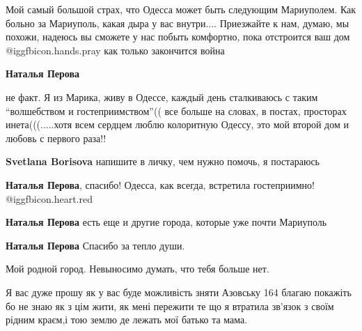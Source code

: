 \begin{itemize}

Мой самый большой страх, что Одесса может быть следующим Мариуполем. Как больно
за Мариуполь, какая дыра у вас внутри.... Приезжайте к нам, думаю, мы похожи,
надеюсь вы сможете у нас побыть комфортно, пока отстроится ваш дом  @igg{fbicon.hands.pray}  как
только закончится война

\begin{itemize} %
\textbf{Наталья Перова} 

не факт. Я из Марика, живу в Одессе, каждый день сталкиваюсь с таким
\enquote{волшебством и гостеприимством}(( все больше на словах, в постах, просторах
инета(((.....хотя всем сердцем люблю колоритную Одессу, это мой второй дом и
любовь с первого раза!!

\textbf{Svetlana Borisova} напишите в личку, чем нужно помочь, я постараюсь

\textbf{Наталья Перова}, спасибо! Одесса, как всегда, встретила гостеприимно! @igg{fbicon.heart.red}

\textbf{Наталья Перова} есть еще и другие города, которые уже почти Мариуполь

\textbf{Наталья Перова} Спасибо за тепло души.
\end{itemize} %

Мой родной город. Невыносимо думать, что тебя больше нет.


Я вас дуже прошу як у вас буде можливість зняти Азовську 164 благаю покажіть бо
не знаю як з цім жити, як мені пережити те що я втратила зв'язок з своїм рідним
краєм,і тою землю де лежать мої батько та мама.


\end{itemize} %
